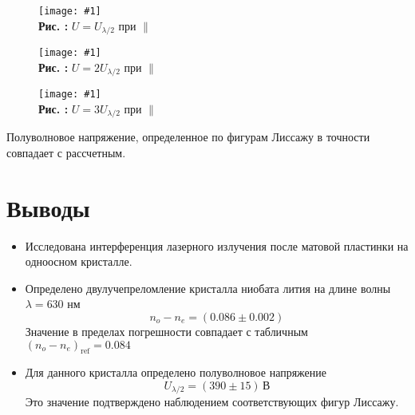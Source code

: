 \documentclass[12pt,a4paper]{article}
\newcounter{picture}
\newcommand{\embed}[3]{\begin{center}
		\texttt{[image: \#1]}
		\\\textbf{Рис. \thepicture:} #3
		\label{pic_\thepicture}
		\addtocounter{picture}{1}
\end{center}}
\begin{document}
	\begin{figure}[h]
		\begin{minipage}{0.33\linewidth}
			\embed{PIC_8.png}{0.08}{$U = U_{\lambda/2}$ при $\parallel$}
		\end{minipage}
		\begin{minipage}{0.33\linewidth}
			\embed{PIC_9.png}{0.05426}{$U = 2U_{\lambda/2}$ при $\parallel$}
		\end{minipage}
		\begin{minipage}{0.33\linewidth}
			\embed{PIC_10.png}{0.07}{$U = 3U_{\lambda/2}$ при $\parallel$}
		\end{minipage}
	\end{figure}
	
	Полуволновое напряжение, определенное по фигурам Лиссажу в точности совпадает с рассчетным.
	
	\section{Выводы}
	
	\begin{itemize}
		\item Исследована интерференция лазерного излучения после матовой пластинки на одноосном кристалле.
		\item Определено двулучепреломление кристалла ниобата лития на длине волны $\lambda = 630$ нм
		$$ n_o - n_e = (0.086 \pm 0.002) $$
		Значение в пределах погрешности совпадает с табличным $(n_o - n_e)_{\mathrm{ref}} = 0.084$
		\item Для данного кристалла определено полуволновое напряжение
		$$ U_{\lambda/2} = (390 \pm 15)\, \text{В} $$
		Это значение подтверждено наблюдением соответствующих фигур Лиссажу.
	\end{itemize}
\end{document}
